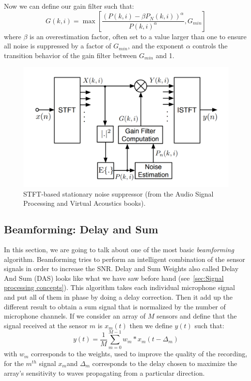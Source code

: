 \documentclass[11pt,a4paper,titlepage]{report}
\begin{document}
Now we can define our gain filter such that:
\begin{equation}
G(k,i) = \max[\frac{(P(k,i)- \beta P_{N}(k,i))^\alpha}{P(k,i)^\alpha}, G_{min}]
\end{equation}
where $\beta$ is an overestimation factor, often set to a value larger than one to ensure all noise is suppressed by a factor of $G_{min}$, and the exponent $\alpha$ controls the transition behavior of the gain filter between $G_{min}$ and 1.
\begin{figure}
	\centering
	\includegraphics[width=0.7\linewidth]{rapport4}
	\caption{STFT-based stationary noise suppressor (from the Audio Signal Processing and Virtual Acoustics books).}
	\label{fig:rapport4}
\end{figure}

\subsection{Beamforming: Delay and Sum}
\hspace*{0.6cm}
In this section, we are going to talk about one of the most basic \emph{beamforming} algorithm. Beamforming tries to perform an intelligent combination of the sensor signals in order to increase the SNR. Delay and Sum Weights also called Delay And Sum (DAS) looks like what we have saw before hand (see~\ref{sec:Signal processing concepts}). This algorithm takes each individual microphone signal and put all of them in phase by doing a delay correction. Then it add up the different result to obtain a sum signal that is normalized by the number of microphone channels.
If we consider an array of $ M $ sensors and define that the signal received at the sensor $ m $ is $x_m(t)$ then we define $ y(t) $ such that:
\begin{equation}
y(t) = \frac{1}{M}\sum_{m=0}^{M-1}{w_{m}* x_{m}(t-\Delta_{m})}
\end{equation}
with $ w_{m} $ corresponds to the weights, used to improve the quality of the recording, for the $ m^{th} $ signal $ x_{m}  $and $\Delta_{m}$ corresponds to the delay chosen to maximize the array's sensitivity to waves propagating from a particular direction.
\end{document}
